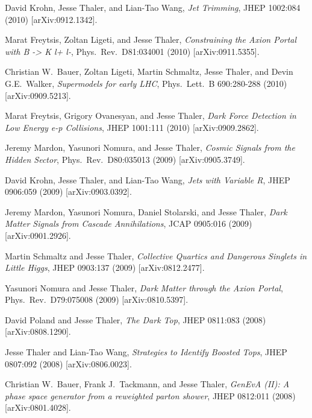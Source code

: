 \begin{list}{[]\addtocounter{jessecount}{-1}}{\leftmargin=3em \itemsep=4pt}
\item
 David Krohn, Jesse Thaler, and Lian-Tao Wang,
\emph{Jet Trimming},
JHEP 1002:084 (2010)
[arXiv:0912.1342].

\item
 Marat Freytsis, Zoltan Ligeti, and Jesse Thaler,
\emph{Constraining the Axion Portal with B -> K l+ l-},
Phys.\ Rev.\ D81:034001 (2010)
[arXiv:0911.5355].

\item
 Christian W.\ Bauer, Zoltan Ligeti, Martin Schmaltz, Jesse Thaler, and Devin G.E.\ Walker,
\emph{Supermodels for early LHC},
Phys.\ Lett.\ B 690:280-288 (2010)
[arXiv:0909.5213].

\item
 Marat Freytsis, Grigory Ovanesyan, and Jesse Thaler,
\emph{Dark Force Detection in Low Energy e-p Collisions},
JHEP 1001:111 (2010)
[arXiv:0909.2862].

\item
 Jeremy Mardon, Yasunori Nomura, and Jesse Thaler,
\emph{Cosmic Signals from the Hidden Sector},
Phys.\ Rev.\ D80:035013 (2009)
[arXiv:0905.3749].

\item
 David Krohn, Jesse Thaler, and Lian-Tao Wang,
\emph{Jets with Variable R},
JHEP 0906:059 (2009)
[arXiv:0903.0392].

\item
 Jeremy Mardon, Yasunori Nomura, Daniel Stolarski, and Jesse Thaler,
\emph{Dark Matter Signals from Cascade Annihilations},
JCAP 0905:016 (2009)
[arXiv:0901.2926].

\item
 Martin Schmaltz and Jesse Thaler,
\emph{Collective Quartics and Dangerous Singlets in Little Higgs},
JHEP 0903:137 (2009)
[arXiv:0812.2477].

\item
 Yasunori Nomura and Jesse Thaler,
\emph{Dark Matter through the Axion Portal},
Phys.\ Rev.\ D79:075008 (2009)
[arXiv:0810.5397].

\item
 David Poland and Jesse Thaler,
\emph{The Dark Top},
JHEP 0811:083 (2008)
[arXiv:0808.1290].

\item
 Jesse Thaler and Lian-Tao Wang,
\emph{Strategies to Identify Boosted Tops},
JHEP 0807:092 (2008)
[arXiv:0806.0023].

\item
 Christian W.\ Bauer, Frank J.\ Tackmann, and Jesse Thaler,
\emph{GenEvA (II): A phase space generator from a reweighted parton shower},
JHEP 0812:011 (2008)
[arXiv:0801.4028].


\end{list}

